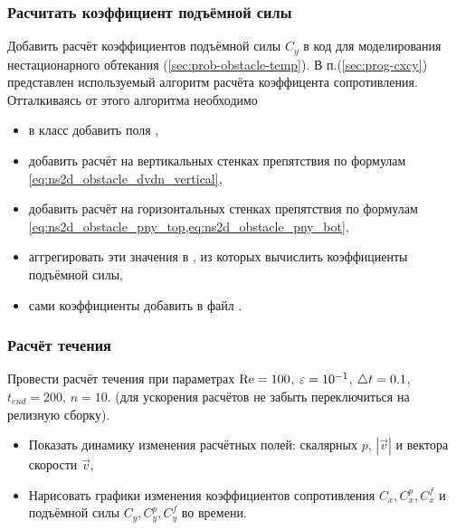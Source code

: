 \subsubsection{Расчитать коэффициент подъёмной силы}
Добавить расчёт коэффициентов подъёмной силы $C_y$ в
код для моделирования нестационарного обтекания (\ref{sec:prob-obstacle-temp}).
В п.(\ref{sec:prog-cxcy}) представлен используемый алгоритм
расчёта коэффицента сопротивления.
Отталкиваясь от этого алгоритма необходимо
\begin{itemize}
\item в класс  добавить поля ,
\item добавить расчёт  на вертикальных стенках препятствия по формулам  \cref{eq:ns2d_obstacle_dvdn_vertical},
\item добавить расчёт  на горизонтальных стенках препятствия по формулам \cref{eq:ns2d_obstacle_pny_top,eq:ns2d_obstacle_pny_bot},
\item аггрегировать эти значения в , из которых вычислить коэффициенты подъёмной силы,
\item сами коэффициенты добавить в файл .
\end{itemize}


\subsubsection{Расчёт течения}
Провести расчёт течения при параметрах $\mathrm{Re} = 100$, $\varepsilon=10^{-1}$, $\triangle t = 0.1$, $t_{end} = 200$, $n=10$.
(для ускорения расчётов не забыть переключиться на релизную сборку).
\begin{itemize}
\item Показать динамику изменения расчётных полей: скалярных $p$, $|\vec v|$ и вектора скорости $\vec v$,
\item Нарисовать графики изменения коэффициентов сопротивления $C_x, C^p_x, C^f_x$ и подъёмной силы $C_y, C^p_y, C^f_y$ во времени.
\end{itemize}
